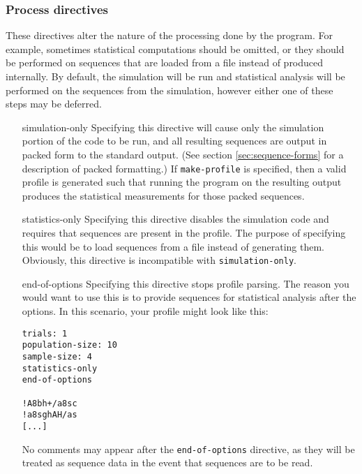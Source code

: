 \documentclass{article}
\begin{document}
      \subsubsection{Process directives}
	\label{sec:process-directives}

	These directives alter the nature of the processing done by the program.
	For example, sometimes statistical computations should be omitted, or
	they should be performed on sequences that are loaded from a file
	instead of produced internally. By default, the simulation will be run
	and statistical analysis will be performed on the sequences from the
	simulation, however either one of these steps may be deferred.

	\begin{enumerate}
	  \item[simulation-only]
	  Specifying this directive will cause only the simulation portion of
	  the code to be run, and all resulting sequences are output in packed
	  form to the standard output. (See section \ref{sec:sequence-forms} for
	  a description of packed formatting.) If \verb|make-profile| is
	  specified, then a valid profile is generated such that running the
	  program on the resulting output produces the statistical measurements
	  for those packed sequences.

	  \item[statistics-only]
	  Specifying this directive disables the simulation code and requires
	  that sequences are present in the profile. The purpose of specifying
	  this would be to load sequences from a file instead of generating
	  them. Obviously, this directive is incompatible with
	  \verb|simulation-only|.

	  \item[end-of-options]
	  Specifying this directive stops profile parsing. The reason you would
	  want to use this is to provide sequences for statistical analysis
	  after the options. In this scenario, your profile might look like
	  this:

	  \begin{verbatim}
trials: 1
population-size: 10
sample-size: 4
statistics-only
end-of-options

!A8bh+/a8sc
!a8sghAH/as
[...]
	  \end{verbatim}

	  No comments may appear after the \verb|end-of-options| directive, as
	  they will be treated as sequence data in the event that sequences are
	  to be read.
	\end{enumerate}
\end{document}
